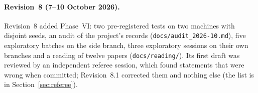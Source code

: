 \documentclass[11pt]{article}
\begin{document}
\begin{abstract}
each. Two-stream key splits resist repair and are prevented by the hinge's key term on a screen ($20/20$ against $15/20$), as the register's are; a replication's probe can be wrong about a plateau; the title is scoped to what was shown.
\end{abstract}

\paragraph{Revision~8 (7--10 October 2026).} Revision~8 added Phase~VI: two pre-registered tests on two machines with disjoint seeds, an audit of the project's records (\texttt{docs/audit\_2026-10.md}), five exploratory batches on the side branch, three exploratory sessions on their own branches and a reading of twelve papers (\texttt{docs/reading/}). Its first draft was reviewed by an independent referee session, which found statements that were wrong when committed; Revision~8.1 corrected them and nothing else (the list is in Section~\ref{sec:referee}).
\end{document}
